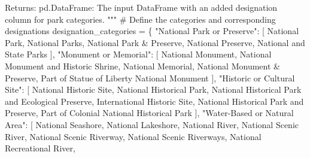 \documentclass[
  letterpaper,
  DIV=11,
  numbers=noendperiod]{scrartcl}
\newenvironment{Shaded}{\begin{snugshade}}{\end{snugshade}}
\newcommand{\CommentTok}[1]{\textcolor[rgb]{0.37,0.37,0.37}{#1}}
\newcommand{\NormalTok}[1]{\textcolor[rgb]{0.00,0.23,0.31}{#1}}
\newcommand{\OperatorTok}[1]{\textcolor[rgb]{0.37,0.37,0.37}{#1}}
\newcommand{\StringTok}[1]{\textcolor[rgb]{0.13,0.47,0.30}{#1}}
\begin{document}
\begin{Shaded}
\begin{Highlighting}[]
\CommentTok{    Returns:}
\CommentTok{        pd.DataFrame: The input DataFrame with an added \textquotesingle{}designation\textquotesingle{} column for park categories.}
\CommentTok{    """}
    \CommentTok{\# Define the categories and corresponding designations}
\NormalTok{    designation\_categories }\OperatorTok{=}\NormalTok{ \{}
        \StringTok{"National Park or Preserve"}\NormalTok{: [}
            \StringTok{\textquotesingle{}National Park\textquotesingle{}}\NormalTok{, }\StringTok{\textquotesingle{}National Parks\textquotesingle{}}\NormalTok{, }\StringTok{\textquotesingle{}National Park \& Preserve\textquotesingle{}}\NormalTok{,}
            \StringTok{\textquotesingle{}National Preserve\textquotesingle{}}\NormalTok{, }\StringTok{\textquotesingle{}National and State Parks\textquotesingle{}}
\NormalTok{        ],}
        \StringTok{"Monument or Memorial"}\NormalTok{: [}
            \StringTok{\textquotesingle{}National Monument\textquotesingle{}}\NormalTok{, }\StringTok{\textquotesingle{}National Monument and Historic Shrine\textquotesingle{}}\NormalTok{,}
            \StringTok{\textquotesingle{}National Memorial\textquotesingle{}}\NormalTok{, }\StringTok{\textquotesingle{}National Monument \& Preserve\textquotesingle{}}\NormalTok{,}
            \StringTok{\textquotesingle{}Part of Statue of Liberty National Monument\textquotesingle{}}
\NormalTok{        ],}
        \StringTok{"Historic or Cultural Site"}\NormalTok{: [}
            \StringTok{\textquotesingle{}National Historic Site\textquotesingle{}}\NormalTok{, }\StringTok{\textquotesingle{}National Historical Park\textquotesingle{}}\NormalTok{,}
            \StringTok{\textquotesingle{}National Historical Park and Ecological Preserve\textquotesingle{}}\NormalTok{,}
            \StringTok{\textquotesingle{}International Historic Site\textquotesingle{}}\NormalTok{, }\StringTok{\textquotesingle{}National Historical Park and Preserve\textquotesingle{}}\NormalTok{,}
            \StringTok{\textquotesingle{}Part of Colonial National Historical Park\textquotesingle{}}
\NormalTok{        ],}
        \StringTok{"Water{-}Based or Natural Area"}\NormalTok{: [}
            \StringTok{\textquotesingle{}National Seashore\textquotesingle{}}\NormalTok{, }\StringTok{\textquotesingle{}National Lakeshore\textquotesingle{}}\NormalTok{, }\StringTok{\textquotesingle{}National River\textquotesingle{}}\NormalTok{,}
            \StringTok{\textquotesingle{}National Scenic River\textquotesingle{}}\NormalTok{, }\StringTok{\textquotesingle{}National Scenic Riverway\textquotesingle{}}\NormalTok{,}
            \StringTok{\textquotesingle{}National Scenic Riverways\textquotesingle{}}\NormalTok{, }\StringTok{\textquotesingle{}National Recreational River\textquotesingle{}}\NormalTok{,}

\end{Highlighting}
\end{Shaded}
\end{document}

